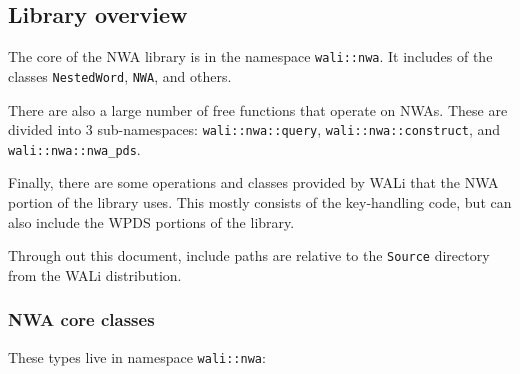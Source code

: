 \subsection{Library overview}

The core of the NWA library is in the namespace \texttt{wali::nwa}. It
includes of the classes \texttt{NestedWord}, \texttt{NWA}, and others.

There are also a large number of free functions that operate on NWAs. These
are divided into 3 sub-namespaces:
\texttt{wali::nwa::query}, \texttt{wali::nwa::construct}, and
\texttt{wali::nwa::nwa\_pds}.

Finally, there are some operations and classes provided by WALi that the NWA
portion of the library uses. This mostly consists of the key-handling code,
but can also include the WPDS portions of the library.

Through out this document, include paths are relative to the \texttt{Source}
directory from the WALi distribution.

\subsubsection{NWA core classes}

These types live in namespace \texttt{wali::nwa}:

